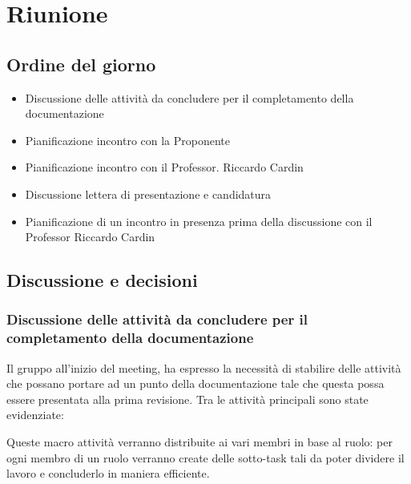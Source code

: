 \section{Riunione}
\subsection{Ordine del giorno}
\begin{itemize}
	\item Discussione delle attività da concludere per il completamento della documentazione
	\item Pianificazione incontro con la Proponente
	\item Pianificazione incontro con il Professor. Riccardo Cardin
	\item Discussione lettera di presentazione e candidatura \RTB
	\item Pianificazione di un incontro in presenza prima della discussione con il Professor Riccardo Cardin
\end{itemize}

\subsection{Discussione e decisioni}
\subsubsection{Discussione delle attività da concludere per il completamento della documentazione}
\par Il gruppo all'inizio del meeting, ha espresso la necessità di stabilire delle attività che possano portare ad un punto della documentazione tale che questa possa essere presentata alla prima revisione. 
Tra le attività principali sono state evidenziate:
\par Queste macro attività verranno distribuite ai vari membri in base al ruolo: per ogni membro di un ruolo verranno create delle sotto-task tali da poter dividere il lavoro e concluderlo in maniera efficiente.

